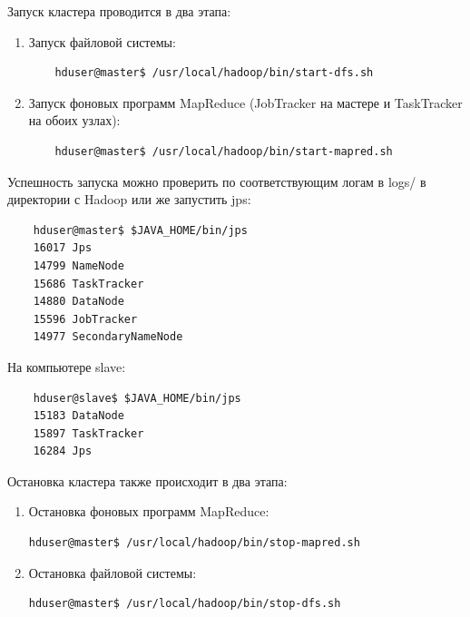 \documentclass[12pt,a4paper]{extarticle} %
\begin{document}
\newpage
\noindent Запуск кластера проводится в два этапа:
\begin{enumerate}
    \item Запуск файловой системы:
    \begin{lstlisting}
    hduser@master$ /usr/local/hadoop/bin/start-dfs.sh
    \end{lstlisting}
    \item Запуск фоновых программ MapReduce (JobTracker на мастере и TaskTracker на обоих узлах):
    \begin{lstlisting}
    hduser@master$ /usr/local/hadoop/bin/start-mapred.sh
    \end{lstlisting}
\end{enumerate}

\noindent Успешность запуска можно проверить по соответствующим логам в logs/ в директории  с Hadoop или же запустить jps:
\begin{lstlisting}
    hduser@master$ $JAVA_HOME/bin/jps
    16017 Jps
    14799 NameNode
    15686 TaskTracker
    14880 DataNode
    15596 JobTracker
    14977 SecondaryNameNode
\end{lstlisting}

\noindent На компьютере slave:
\begin{lstlisting}
    hduser@slave$ $JAVA_HOME/bin/jps
    15183 DataNode
    15897 TaskTracker
    16284 Jps
\end{lstlisting}

\noindent Остановка кластера также происходит в два этапа:
\begin{enumerate}
    \item Остановка фоновых программ MapReduce:
    \begin{lstlisting}[language=sh]
    hduser@master$ /usr/local/hadoop/bin/stop-mapred.sh
    \end{lstlisting}
    \item Остановка файловой системы:
    \begin{lstlisting}[language=sh]
    hduser@master$ /usr/local/hadoop/bin/stop-dfs.sh
    \end{lstlisting}
\end{enumerate}
\end{document}
